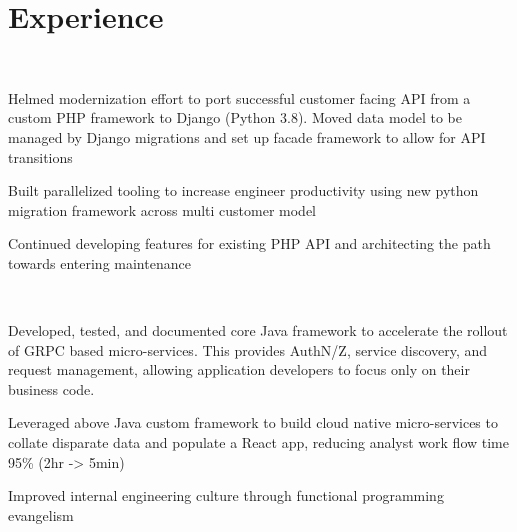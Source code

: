 \documentclass[letterpaper]{deedy-resume-openfont} %
\begin{document}
%
\begin{minipage}[t]{0.66\textwidth} %


\section{Experience}

\\

\vspace{\topsep} %
\begin{tightitemize}
\item Helmed modernization effort to port successful customer facing API from a custom PHP framework to Django (Python 3.8). Moved data model to be managed by Django migrations and set up facade framework to allow for API transitions
\item Built parallelized tooling to increase engineer productivity using new python migration framework across multi customer model
\item Continued developing features for existing PHP API and architecting the path towards entering maintenance
\end{tightitemize}

\\

\begin{tightitemize}
\item Developed, tested, and documented core Java framework to accelerate the rollout of GRPC based micro-services. This provides AuthN/Z, service discovery, and request management, allowing application developers to focus only on their business code.
\item Leveraged above Java custom framework to build cloud native micro-services to collate disparate data and populate a React app, reducing analyst work flow time 95\% (2hr -> 5min)
\item Improved internal engineering culture through functional programming evangelism


\end{tightitemize}
\end{minipage}
\end{document}
